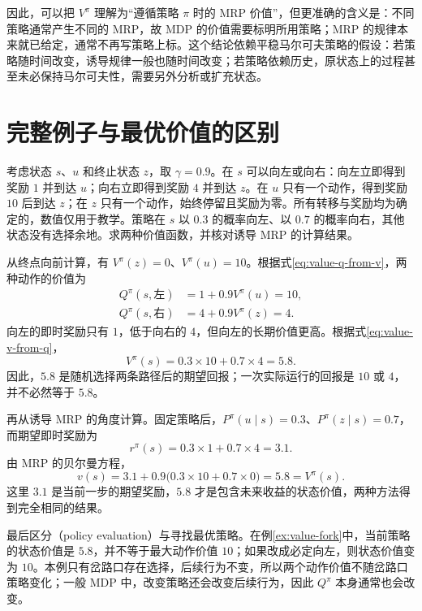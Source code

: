 \documentclass[UTF8]{ctexart}
\begin{document}
因此，可以把 $V^\pi$ 理解为“遵循策略 $\pi$ 时的 MRP 价值”，但更准确的含义是：不同策略通常产生不同的 MRP，故 MDP 的价值需要标明所用策略；MRP 的规律本来就已给定，通常不再写策略上标。这个结论依赖平稳马尔可夫策略的假设：若策略随时间改变，诱导规律一般也随时间改变；若策略依赖历史，原状态上的过程甚至未必保持马尔可夫性，需要另外分析或扩充状态。

\section{完整例子与最优价值的区别}
\label{sec:value-example}

\begin{example}[同一个岔路口的两种评价]
\label{ex:value-fork}
考虑状态 $s$、$u$ 和终止状态 $z$，取 $\gamma=0.9$。在 $s$ 可以向左或向右：向左立即得到奖励 $1$ 并到达 $u$；向右立即得到奖励 $4$ 并到达 $z$。在 $u$ 只有一个动作，得到奖励 $10$ 后到达 $z$；在 $z$ 只有一个动作，始终停留且奖励为零。所有转移与奖励均为确定的，数值仅用于教学。策略在 $s$ 以 $0.3$ 的概率向左、以 $0.7$ 的概率向右，其他状态没有选择余地。求两种价值函数，并核对诱导 MRP 的计算结果。
\end{example}

\begin{solve}
从终点向前计算，有 $V^\pi(z)=0$、$V^\pi(u)=10$。根据式\eqref{eq:value-q-from-v}，两种动作的价值为
\[
  \begin{aligned}
    Q^\pi(s,\text{左})&=1+0.9V^\pi(u)=10,\\
    Q^\pi(s,\text{右})&=4+0.9V^\pi(z)=4.
  \end{aligned}
\]
向左的即时奖励只有 $1$，低于向右的 $4$，但向左的长期价值更高。根据式\eqref{eq:value-v-from-q}，
\[
  V^\pi(s)=0.3\times10+0.7\times4=5.8.
\]
因此，$5.8$ 是随机选择两条路径后的期望回报；一次实际运行的回报是 $10$ 或 $4$，并不必然等于 $5.8$。

再从诱导 MRP 的角度计算。固定策略后，$P^\pi(u\mid s)=0.3$、$P^\pi(z\mid s)=0.7$，而期望即时奖励为
\[
  r^\pi(s)=0.3\times1+0.7\times4=3.1.
\]
由 MRP 的贝尔曼方程，
\[
  v(s)=3.1+0.9\bigl(0.3\times10+0.7\times0\bigr)=5.8=V^\pi(s).
\]
这里 $3.1$ 是当前一步的期望奖励，$5.8$ 才是包含未来收益的状态价值，两种方法得到完全相同的结果。
\end{solve}

最后区分（policy evaluation）与寻找最优策略。在例\ref{ex:value-fork}中，当前策略的状态价值是 $5.8$，并不等于最大动作价值 $10$；如果改成必定向左，则状态价值变为 $10$。本例只有岔路口存在选择，后续行为不变，所以两个动作价值不随岔路口策略变化；一般 MDP 中，改变策略还会改变后续行为，因此 $Q^\pi$ 本身通常也会改变。
\end{document}
